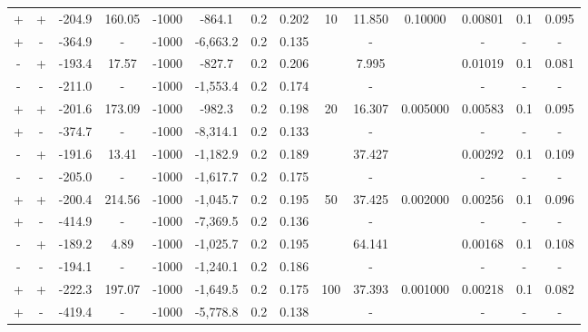 \documentclass[11pt]{article}
\begin{document}
\begin{table}
{\begin{tabular}{cccccccccccccc}
\midrule
         + &        + & -204.9 &    160.05 & -1000 &    -864.1 &  0.2 &  0.202 &   \multirow{4}{*}{10} &  11.850 & \multirow{4}{*}{0.10000} &  0.00801 &     0.1 &       0.095 \\ 
         + &        - & -364.9 &         - & -1000 &  -6,663.2 &  0.2 &  0.135 &    &       - &   &        - &       - &           - \\
         - &        + & -193.4 &     17.57 & -1000 &    -827.7 &  0.2 &  0.206 &    &   7.995 &   &  0.01019 &     0.1 &       0.081 \\
         - &        - & -211.0 &         - & -1000 &  -1,553.4 &  0.2 &  0.174 &    &       - &   &        - &       - &           - \\  \midrule
         + &        + & -201.6 &    173.09 & -1000 &    -982.3 &  0.2 &  0.198 &   \multirow{4}{*}{20} &  16.307 &  \multirow{4}{*}{0.005000} &  0.00583 &     0.1 &       0.095 \\
         + &        - & -374.7 &         - & -1000 &  -8,314.1 &  0.2 &  0.133 &    &       - &   &        - &       - &           - \\
         - &        + & -191.6 &     13.41 & -1000 &  -1,182.9 &  0.2 &  0.189 &    &  37.427 &   &  0.00292 &     0.1 &       0.109 \\
         - &        - & -205.0 &         - & -1000 &  -1,617.7 &  0.2 &  0.175 &    &       - &   &        - &       - &           - \\  \midrule
         + &        + & -200.4 &    214.56 & -1000 &  -1,045.7 &  0.2 &  0.195 &   \multirow{4}{*}{50} &  37.425 &  \multirow{4}{*}{0.002000} &  0.00256 &     0.1 &       0.096 \\
         + &        - & -414.9 &         - & -1000 &  -7,369.5 &  0.2 &  0.136 &    &       - &   &        - &       - &           - \\
         - &        + & -189.2 &      4.89 & -1000 &  -1,025.7 &  0.2 &  0.195 &    &  64.141 &   &  0.00168 &     0.1 &       0.108 \\
         - &        - & -194.1 &         - & -1000 &  -1,240.1 &  0.2 &  0.186 &    &       - &   &        - &       - &           - \\ \midrule
         + &        + & -222.3 &    197.07 & -1000 &  -1,649.5 &  0.2 &  0.175 &  \multirow{4}{*}{100} &  37.393 &  \multirow{4}{*}{0.001000} &  0.00218 &     0.1 &       0.082 \\
         + &        - & -419.4 &         - & -1000 &  -5,778.8 &  0.2 &  0.138 &   &       - &   &        - &       - &           - \\

\end{tabular}}
\end{table}
\end{document}
